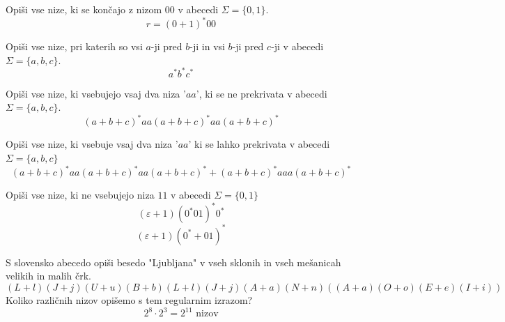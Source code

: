 \documentclass[10pt,a4paper,oneside]{book}
\begin{document}
\label{sec:RI}
\begin{primeri}
\item Opiši vse nize, ki se končajo z nizom $00$ v abecedi $\Sigma = \{ 0,1 \}$.
	\[ r = (0+1)^*00 \]
	\item Opiši vse nize, pri katerih so vsi $a$-ji pred $b$-ji in vsi $b$-ji pred $c$-ji v abecedi $\Sigma = \{ a,b,c \}$.
		\[ a^*b^*c^* \]
	\item Opiši vse nize, ki vsebujejo vsaj dva niza '$aa$', ki se ne prekrivata v abecedi $\Sigma = \{ a,b,c \}$.
		\[ (a+b+c)^* aa (a+b+c)^* aa (a+b+c)^* \]
	\item Opiši vse nize, ki vsebuje vsaj dva niza '$aa$' ki se lahko prekrivata v abecedi $\Sigma = \{ a,b,c \}$
		\[ (a+b+c)^* aa (a+b+c)^* aa (a+b+c)^* + (a+b+c)^* aaa (a+b+c)^* \]
	\item Opiši vse nize, ki ne vsebujejo niza $11$ v abecedi $\Sigma = \{ 0,1 \}$
		\[ (\varepsilon  + 1 )(0^*01)^* 0^*	\]
		\[ (\varepsilon  + 1 )(0^* + 01)^* \]
	\item S slovensko abecedo opiši besedo "Ljubljana" v vseh sklonih in vseh mešanicah velikih in malih črk.
		\[ (L+l)(J+j)(U+u)(B+b)(L+l)(J+j)(A+a)(N+n)( (A+a)(O+o)(E+e)(I+i) ) \]
		Koliko različnih nizov opišemo s tem regularnim izrazom?\\
		\[ 2^8 \cdot 2^3 = 2^{11} \mbox{ nizov} \]
\end{primeri}
\label{sec:KA}
\end{document}
